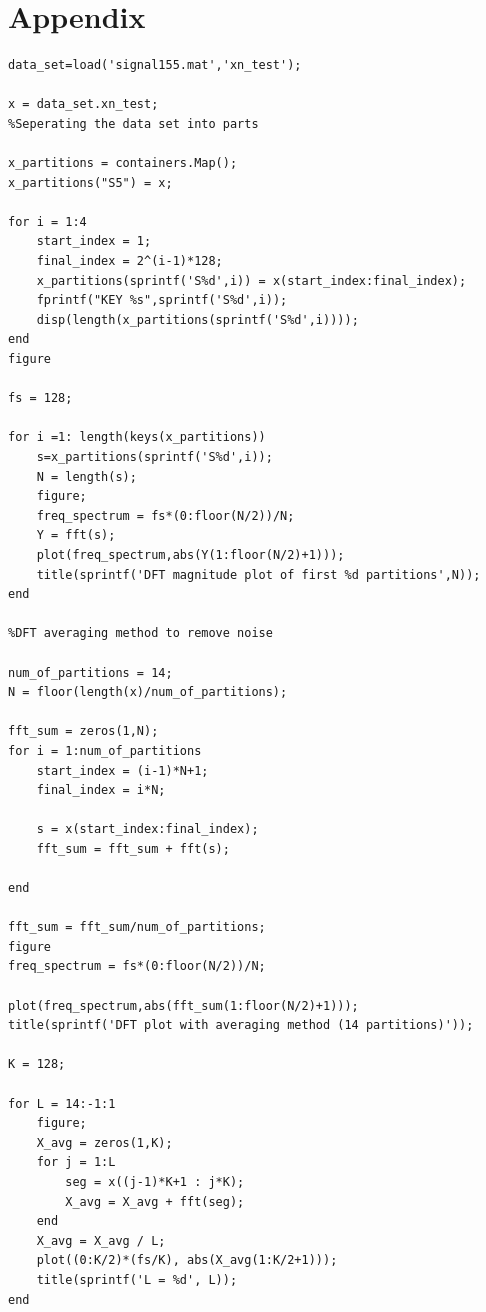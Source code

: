 \documentclass{article}
\begin{document}
\section*{Appendix}
\begin{lstlisting}[style=mymatlab, caption={Matlab code for Section 3.1 Harmonic Detection}, label={lst:harmonic_detection}]
data_set=load('signal155.mat','xn_test');

x = data_set.xn_test;
%Seperating the data set into parts

x_partitions = containers.Map();
x_partitions("S5") = x;

for i = 1:4
    start_index = 1;
    final_index = 2^(i-1)*128;
    x_partitions(sprintf('S%d',i)) = x(start_index:final_index);
    fprintf("KEY %s",sprintf('S%d',i));
    disp(length(x_partitions(sprintf('S%d',i))));
end
figure

fs = 128;

for i =1: length(keys(x_partitions))
    s=x_partitions(sprintf('S%d',i));
    N = length(s);
    figure;
    freq_spectrum = fs*(0:floor(N/2))/N;
    Y = fft(s);
    plot(freq_spectrum,abs(Y(1:floor(N/2)+1)));
    title(sprintf('DFT magnitude plot of first %d partitions',N));
end

%DFT averaging method to remove noise

num_of_partitions = 14;
N = floor(length(x)/num_of_partitions);

fft_sum = zeros(1,N);
for i = 1:num_of_partitions
    start_index = (i-1)*N+1;
    final_index = i*N;

    s = x(start_index:final_index);
    fft_sum = fft_sum + fft(s);
    
end

fft_sum = fft_sum/num_of_partitions;
figure
freq_spectrum = fs*(0:floor(N/2))/N;

plot(freq_spectrum,abs(fft_sum(1:floor(N/2)+1)));
title(sprintf('DFT plot with averaging method (14 partitions)'));

K = 128;

for L = 14:-1:1
    figure;
    X_avg = zeros(1,K);
    for j = 1:L
        seg = x((j-1)*K+1 : j*K);
        X_avg = X_avg + fft(seg);
    end
    X_avg = X_avg / L;
    plot((0:K/2)*(fs/K), abs(X_avg(1:K/2+1)));
    title(sprintf('L = %d', L));
end
\end{lstlisting}
\end{document}
